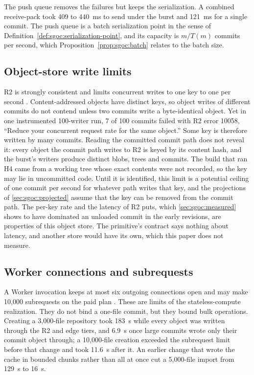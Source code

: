 \documentclass[11pt,letterpaper]{article}
\theoremstyle{definition}
\theoremstyle{remark}
\begin{document}
The push queue removes the failures but keeps the serialization. A combined receive-pack took 409 to 440~ms to send under the burst and 121~ms for a single commit. %
The push queue is a batch serialization point in the sense of Definition~\ref{def:sgoc:serialization-point}, and its capacity is $m/T(m)$ commits per second, which Proposition~\ref{prop:sgoc:batch} relates to the batch size.

\subsection{Object-store write limits}

R2 is strongly consistent and limits concurrent writes to one key to one per second \cite{cfr2limits,cfr2consistency}. Content-addressed objects have distinct keys, so object writes of different commits do not contend unless two commits write a byte-identical object. Yet in one instrumented 100-writer run, 7 of 100 commits failed with R2 error 10058, ``Reduce your concurrent request rate for the same object.'' %
Some key is therefore written by many commits. Reading the committed commit path does not reveal it: every object the commit path writes to R2 is keyed by its content hash, and the burst's writers produce distinct blobs, trees and commits. The build that ran H4 came from a working tree whose exact contents were not recorded, so the key may lie in uncommitted code. Until it is identified, this limit is a potential ceiling of one commit per second for whatever path writes that key, and the projections of \cref{sec:sgoc:projected} assume that the key can be removed from the commit path. The per-key rate and the latency of R2 puts, which \cref{sec:sgoc:measured} shows to have dominated an unloaded commit in the early revisions, are properties of this object store. The primitive's contract says nothing about latency, and another store would have its own, which this paper does not measure.

\subsection{Worker connections and subrequests}

A Worker invocation keeps at most six outgoing connections open and may make 10,000 subrequests on the paid plan \cite{cfworkerslimits}. These are limits of the stateless-compute realization. They do not bind a one-file commit, but they bound bulk operations. Creating a 3,000-file repository took 183~s while every object was written through the R2 and edge tiers, and 6.9~s once large commits wrote only their commit object through; a 10,000-file creation exceeded the subrequest limit before that change and took 11.6~s after it. %
An earlier change that wrote the cache in bounded chunks rather than all at once cut a 5,000-file import from 129~s to 16~s. %
\end{document}
